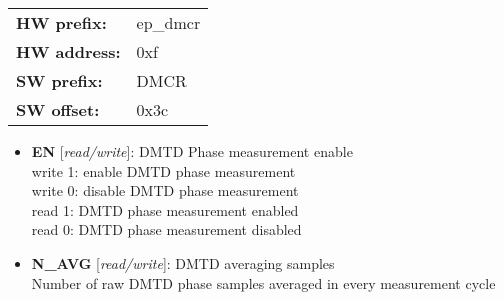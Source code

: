 \begin{tabular}{l l }
{\bf HW prefix:}  & ep\_dmcr\\
{\bf HW address:}  & 0xf\\
{\bf SW prefix:}  & DMCR\\
{\bf SW offset:}  & 0x3c\\
\end{tabular}


\vspace{12pt}
\noindent
{}

\begin{itemize}
\item \begin{small}
{\bf 
EN
} [\emph{read/write}]: DMTD Phase measurement enable
\\
write 1: enable DMTD phase measurement \\                        write 0: disable DMTD phase measurement \\                        read 1: DMTD phase measurement enabled \\                        read 0: DMTD phase measurement disabled
\end{small}
\item \begin{small}
{\bf 
N\_AVG
} [\emph{read/write}]: DMTD averaging samples
\\
Number of raw DMTD phase samples averaged in every measurement cycle
\end{small}
\end{itemize}
